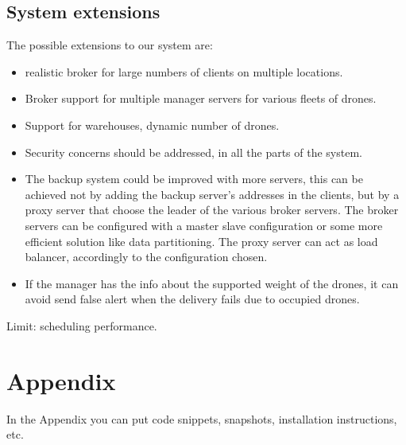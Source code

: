 \documentclass[a4paper, oneside]{memoir}
\begin{document}
\section{System extensions}
The possible extensions to our system are:
\begin{itemize}
	\item realistic broker for large numbers of clients on multiple locations.
	\item Broker support for multiple manager servers for various fleets of drones.
	\item Support for warehouses, dynamic number of drones.
	\item Security concerns should be addressed, in all the parts of the system.
	\item The backup system could be improved with more servers, this can be achieved not by adding the backup server's addresses in the clients, but by a proxy server that choose the leader of the various broker servers. The broker servers can be configured with a master slave configuration or some more efficient solution like data partitioning. The proxy server can act as load balancer, accordingly to the configuration chosen.
	\item If the manager has the info about the supported weight of the drones, it can avoid send false alert when the delivery fails due to occupied drones.
\end{itemize}

Limit: scheduling performance.


\appendix

\chapter{Appendix}

In the Appendix you can put code snippets, snapshots, installation instructions, etc.
\end{document}
